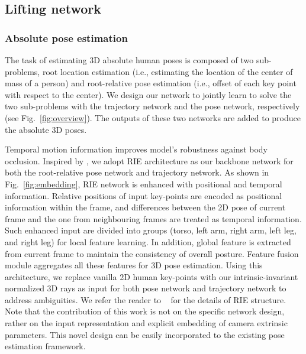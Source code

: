 \documentclass[10pt,twocolumn,letterpaper]{article}
\begin{document}
\subsection{Lifting network}
\label{sec:network}





\subsubsection*{Absolute pose estimation} 
\label{subsec: abs_pose}
The task of estimating 3D absolute human poses is composed of two sub-problems, root location estimation (i.e., estimating the location of the center of mass of a person) and root-relative pose estimation (i.e., offset of each key point with respect to the center). We design our network to jointly learn to solve the two sub-problems with the trajectory network and the pose network, respectively (see Fig.~\ref{fig:overview}). The outputs of these two networks are added to produce the absolute 3D poses.

Temporal motion information improves model's robustness against body occlusion. Inspired by \cite{wenkang2021improving}, we adopt RIE architecture as our backbone network for both the root-relative pose network and trajectory network. As shown in Fig.~\ref{fig:embedding}, RIE network is enhanced with positional and temporal information. Relative positions of input key-points are encoded as positional information within the frame, and differences between the 2D pose of current frame and the one from neighbouring frames are treated as temporal information. Such enhanced input are divided into  groups (torso, left arm, right arm, left leg, and right leg) for local feature learning. In addition, global feature is extracted from current frame to maintain the consistency of overall posture. Feature fusion module aggregates all these features for 3D pose estimation. Using this architecture, we replace vanilla 2D human key-points with our intrinsic-invariant normalized 3D rays as input for both pose network and trajectory network to address ambiguities. We refer the reader to ~\cite{wenkang2021improving} for the details of RIE structure. Note that the contribution of this work is not on the specific network design, rather on the input representation and explicit embedding of camera extrinsic parameters. This novel design can be easily incorporated to the existing pose estimation framework. 
\end{document}
